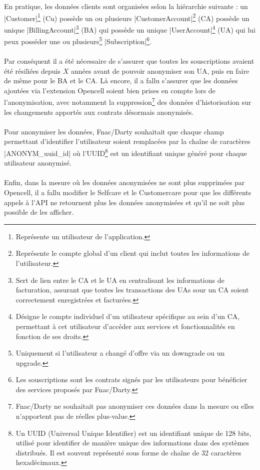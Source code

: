 \documentclass[12pt, a4paper]{report}
\begin{document}
	\newpage
	\noindent
	En pratique, les données clients sont organisées selon la hiérarchie suivante : un \cverb|Customer|\footnote{Représente un utilisateur de l'application.} (Cu) possède un ou plusieurs \cverb|CustomerAccount|\footnote{Représente le compte global d'un client qui inclut toutes les informations de l'utilisateur.} (CA) possède un unique \cverb|BillingAccount|\footnote{Sert de lien entre le CA et le UA en centralisant les informations de facturation, assurant que toutes les transactions des UAs sour un CA soient correctement enregistrées et facturées.} (BA) qui possède un unique \cverb|UserAccount|\footnote{Désigne le compte individuel d'un utilisateur spécifique au sein d'un CA, permettant à cet utilisateur d'accéder aux services et fonctionnalités en fonction de ses droits.} (UA) qui lui peux posséder une ou plusieurs\footnote{Uniquement si l'utilisateur a changé d'offre via un downgrade ou un upgrade.} \cverb|Subscription|\footnote{Les souscriptions sont les contrats signés par les utilisateurs pour bénéficier des services proposés par Fnac/Darty.}.
	\\\\
	Par conséquent il a été nécessaire de s'assurer que toutes les souscriptions avaient été résiliées depuis $X$ années avant de pouvoir anonymiser son UA, puis en faire de même pour le BA et le CA. Là encore, il a fallu s'assurer que les données ajoutées via l'extension Opencell soient bien prises en compte lors de l'anonymisation, avec notamment la suppression\footnote{Fnac/Darty ne souhaitait pas anonymiser ces données dans la mesure ou elles n'apportent pas de réelles plus-value.} des données d'historisation sur les changements apportés aux contrats désormais anonymisés.
	\\\\
	Pour anonymiser les données, Fnac/Darty souhaitait que chaque champ permettant d'identifier l'utilisateur soient remplacées par la chaîne de caractères \cverb|ANONYM_uuid_id| où l'UUID\footnote{Un UUID (Universal Unique Identifier) est un identifiant unique de 128 bits, utilisé pour identifier de manière unique des informations dans des systèmes distribués. Il est souvent représenté sous forme de chaîne de 32 caractères hexadécimaux.} est un identifiant unique généré pour chaque utilisateur anonymisé.
	\\\\
	Enfin, dans la mesure où les données anonymisées ne sont plus supprimées par Opencell, il a fallu modifier le Selfcare et le Customercare pour que les différents appels à l'API ne retournent plus les données anonymisées et qu'il ne soit plus possible de les afficher.
\end{document}
